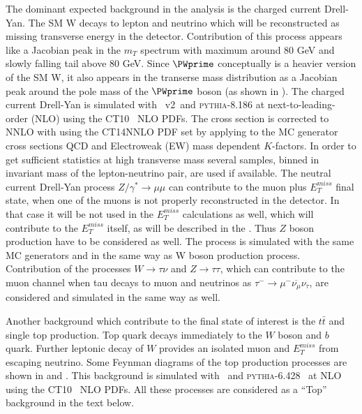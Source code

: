 The dominant expected background in the analysis is the charged current Drell-Yan.
The SM W decays to lepton and neutrino which will be reconstructed as missing transverse energy in the detector.
Contribution of this process appears like a Jacobian peak in the $m_T$ spectrum
with maximum around 80 GeV and slowly falling tail above 80 GeV.
Since $\PWprime$ conceptually is a heavier version of the SM W, it also appears in the 
transerse mass distribution as a Jacobian peak around the pole mass of the $\PWprime$ boson (as shown in ). 
The charged current Drell-Yan is simulated with \powhegbox\ v2~\cite{Alioli:2010xd}and {\scshape pythia-8.186} at next-to-leading-order (NLO) using the CT10~\cite{CT10} NLO PDFs. 
The cross section is corrected to NNLO with using the CT14NNLO PDF set by applying to the MC generator cross sections QCD and Electroweak (EW) mass dependent $K$-factors.
In order to get sufficient statistics at high transverse mass several samples, binned in invariant mass of the lepton-neutrino pair, are used if available.
The neutral current Drell-Yan process $Z/\gamma^* \to \mu \mu$ can contribute to the muon plus $E_T^{miss}$ final state, when one of the muons is not properly reconstructed 
in the detector. In that case it will be not used in the $E_T^{miss}$ calculations as well, which will contribute to the $E_T^{miss}$ itself, as will be described in the .
Thus $Z$ boson production have to be considered as well. The process is simulated with the same MC generators and in the same way as W boson production process.
Contribution of the processes $W \to \tau \nu$ and $Z \to \tau \tau$, which can contribute to the muon channel 
when tau decays to muon and neutrinos as $\tau^{-} \to \mu^{-} \overline{\nu_{\mu}} \nu_{\tau}$, are considered and simulated in the same way as well.

Another background which contribute to the final state of interest is the $t\bar{t}$ and single top production.
Top quark decays immediately to the $W$ boson and $b$ quark. Further leptonic decay of $W$ provides an isolated muon and $E_T^{miss}$ from escaping neutrino.
Some Feynman diagrams of the top production processes are shown in  and .
This background is simulated with \powhegbox\ and {\scshape pythia-6.428}~\cite{Pythia} at NLO using the CT10~\cite{CT10} NLO PDFs.
All these processes are considered as a ``Top'' background in the text below.

